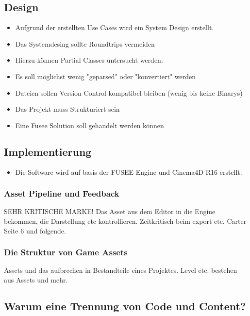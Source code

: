 \documentclass[pagesize, paper=a4, fontsize=12pt,titlepage=true, headings=small, headnosepline, abstractoff, liststotoc, nochapterprefix, plainheadsepline, twoside]{scrreprt}
\begin{document}
\subsection{Design}
\begin{itemize}
\item Aufgrund der erstellten Use Cases wird ein System Design erstellt.
\item Das Systemdesing sollte Roundtrips vermeiden
\item Hierzu können Partial Classes untersucht werden.
\item Es soll möglichst wenig "geparsed" oder "konvertiert" werden
\item Dateien sollen Version Control kompatibel bleiben (wenig bis keine Binarys)
\item Das Projekt muss Strukturiert sein
\item Eine Fusee Solution soll gehandelt werden können
\end{itemize}

\subsection{Implementierung}
\begin{itemize}
\item Die Software wird auf basis der FUSEE Engine und Cinema4D R16 erstellt.
\end{itemize}

\subsubsection{Asset Pipeline und Feedback}
SEHR KRITISCHE MARKE! Das Asset aus dem Editor in die Engine bekommen, die Darstellung etc kontrollieren.
Zeitkritisch beim export etc.
Carter Seite 6 und folgende.

\subsubsection{Die Struktur von Game Assets}
Assets und das aufbrechen in Bestandteile eines Projektes. Level etc. bestehen aus Assets und mehr.
\subsection{Warum eine Trennung von Code und Content?}

\end{document}
